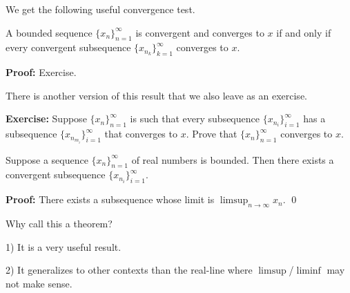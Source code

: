 \documentclass[10pt,aspectratio=149]{beamer}
\begin{document}
\begin{frame}

We get the following useful convergence test.

\begin{proposition}
A bounded sequence $\{ x_n \}_{n=1}^\infty$ is convergent and converges to $x$
if and only if
every convergent subsequence
$\{ x_{n_k} \}_{k=1}^\infty$ converges to $x$.
\end{proposition}

\pause
\textbf{Proof:} Exercise.

\pause
\medskip

There is another version of this result that we also leave as an exercise.

\medskip

\textbf{Exercise:}
Suppose $\{ x_n \}_{n=1}^\infty$ is such that every subsequence
$\{ x_{n_i} \}_{i=1}^\infty$ has a subsequence
$\{ x_{n_{m_i}} \}_{i=1}^\infty$ that converges to $x$.
Prove that $\{ x_n \}_{n=1}^\infty$ converges to $x$.

\end{frame}

\begin{frame}

\begin{theorem}
Suppose a sequence $\{ x_n \}_{n=1}^\infty$ of real numbers is bounded.
Then there exists a convergent subsequence $\{ x_{n_i} \}_{i=1}^\infty$.
\end{theorem}

\pause
\textbf{Proof:}
There exists a subsequence whose limit is $\displaystyle \limsup_{n\to\infty} x_n$.
\qed

\pause
\medskip

Why call this a theorem?

\pause
\medskip

1) It is a very useful result.

\pause
\medskip

2) It generalizes to other contexts than the real-line where
$\limsup$/$\liminf$ may not make sense.


\end{frame}
\end{document}

